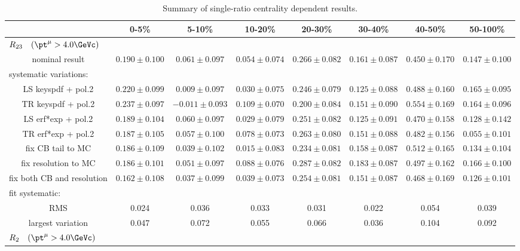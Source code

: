 \begin{table}
  \centering
  \caption{Summary of single-ratio centrality dependent results.
}
  \begin{tabular}{c|ccccccc}
    \hline
 &  0-5\% & 5-10\% & 10-20\% & 20-30\% & 30-40\% & 40-50\% & 50-100\% \\
\hline

\hline
 \multicolumn{8}{l}{$R_{23} \quad (\pt^\mu>4.0\GeVc)$} \\
nominal result             & $0.190\pm0.100$ & $0.061\pm0.097$ & $0.054\pm0.074$ & $0.266\pm0.082$ & $0.161\pm0.087$ & $0.450\pm0.170$ & $0.147\pm0.100$ \\
\hline
 \multicolumn{8}{l}{systematic variations:} \\
LS keyspdf + pol.2         & $0.220\pm0.099$ & $0.009\pm0.097$ & $0.030\pm0.075$ & $0.246\pm0.079$ & $0.125\pm0.088$ & $0.488\pm0.160$ & $0.165\pm0.095$ \\
TR keyspdf + pol.2         & $0.237\pm0.097$ &$-0.011\pm0.093$ & $0.109\pm0.070$ & $0.200\pm0.084$ & $0.151\pm0.090$ & $0.554\pm0.169$ & $0.164\pm0.096$ \\
LS erf*exp + pol.2         & $0.189\pm0.104$ & $0.060\pm0.097$ & $0.029\pm0.079$ & $0.251\pm0.082$ & $0.125\pm0.091$ & $0.470\pm0.158$ & $0.128\pm0.142$ \\
TR erf*exp + pol.2         & $0.187\pm0.105$ & $0.057\pm0.100$ & $0.078\pm0.073$ & $0.263\pm0.080$ & $0.151\pm0.088$ & $0.482\pm0.156$ & $0.055\pm0.101$ \\
fix CB tail to MC          & $0.186\pm0.109$ & $0.039\pm0.102$ & $0.015\pm0.083$ & $0.234\pm0.081$ & $0.158\pm0.087$ & $0.512\pm0.165$ & $0.134\pm0.104$ \\
fix resolution to MC       & $0.186\pm0.101$ & $0.051\pm0.097$ & $0.088\pm0.076$ & $0.287\pm0.082$ & $0.183\pm0.087$ & $0.497\pm0.162$ & $0.166\pm0.100$ \\
fix both CB and resolution & $0.162\pm0.108$ & $0.037\pm0.099$ & $0.039\pm0.073$ & $0.254\pm0.081$ & $0.151\pm0.087$ & $0.468\pm0.169$ & $0.126\pm0.101$ \\
\hline
 \multicolumn{8}{l}{fit systematic:} \\
RMS                        & 0.024 & 0.036 & 0.033 & 0.031 & 0.022 & 0.054 & 0.039 \\
largest variation          & 0.047 & 0.072 & 0.055 & 0.066 & 0.036 & 0.104 & 0.092 \\
\hline \hline
 \multicolumn{8}{l}{$R_{2} \quad (\pt^\mu>4.0\GeVc)$} \\

\end{tabular}
\end{table}

